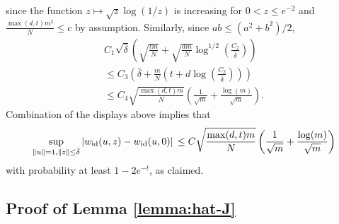 \documentclass[12pt]{article}
\def\l{\left}
\def\r{\right}
\theoremstyle{thmstyletwo}%
\theoremstyle{thmstylethree}%
\begin{document}
since the function $z\mapsto \sqrt{z}\log(1/z)$ is increasing for $0<z\leq e^{-2}$ and $\frac{\max(d,t)m^2}{N}\leq c$ by assumption. Similarly, since $ab\leq (a^2+b^2)/2$,
\begin{multline*}
C_1 \sqrt{\bar\delta}\l(\sqrt{\frac{tm}{N}}+\sqrt{\frac{dm}{N}}\log^{1/2}\l( \frac{C_2}{\bar\delta}\r)\r) 
\\
\leq C_3 \l( \bar\delta + \frac{m}{N}\l( t+d\log\l( \frac{C_2}{\bar\delta}\r)\r)\r)
\\
\leq C_4\sqrt{\frac{\max(d,t)m}{N}}\l( \frac{1}{\sqrt m} + \frac{\log(m)}{\sqrt m} \r).
\end{multline*}
Combination of the displays above implies that
\begin{equation*}
        \sup\limits_{\|u\|=1,\|z\|\leq \bar\delta} \l| w_{\mathrm{id}}(u,z) - w_{\mathrm{id}}(u,0)\r| \\
        \leq C\sqrt{\frac{\max(d,t)m}{N}}\l( \frac{1}{\sqrt m} + \frac{\log(m)}{\sqrt m} \r)
\end{equation*}
with probability at least $1-2e^{-t}$, as claimed.


\subsection{Proof of Lemma \ref{lemma:hat-J}}
\label{proof:hat-J}
\end{document}
